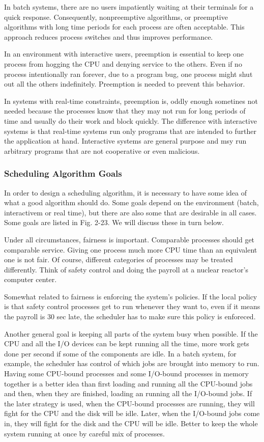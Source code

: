 \documentclass{book}
\begin{document}
In batch systems, there are no users impatiently waiting at their terminals for a quick response.
Consequently, nonpreemptive algorithms, or preemptive algorithms with long time periods for each process are often acceptable.
This approach reduces process switches and thus improves performance.

In an environment with interactive users, preemption is essential to 
keep one process from hogging the CPU and denying service to the others.
Even if no process intentionally ran forever, due to a program bug, one process might shut out all the others indefinitely.
Preemption is needed to prevent this behavior.

In systems with real-time constraints, preemption is, oddly enough sometines not needed because the processes know that
they may not run for long periods of time and usually do their work and block quickly.
The difference with interactive systems is that real-time systems run only programs that are intended to further the application at hand.
Interactive systems are general purpose and msy run arbitrary programs that are not cooperative or even malicious.

\subsubsection*{Scheduling Algorithm Goals}
In order to design a scheduling algorithm, it is necessary to have some idea of what a good algorithm should do.
Some goals depend on the environment (batch, interactivem or real time),
but there are also some that are desirable in all cases.
Some goals are listed in Fig. 2-23.
We will discuss these in turn below.

Under all circumstances, fairness is important.
Comparable processes should get comparable service.
Giving one process much more CPU time than an equivalent one is not fair.
Of course, different categories of processes may be treated differently.
Think of safety control and doing the payroll at a nuclear reactor's computer center.

Somewhat related to fairness is enforcing the system's policies.
If the local policy is that safety control processes get to run whenever they want to,
even if it means the payroll is 30 sec late, the scheduler has to make sure this policy is enforeced.

Another general goal is keeping all parts of the system busy when possible.
If the CPU and all the I/O devices can be kept running all the time, more work gets done per second if some of the components are idle.
In a batch system, for example, the scheduler has control of which jobs are brought into memory to run.
Having some CPU-bound processes and some I/O-bound processes in memory together is a better idea than 
first loading and running all the CPU-bound jobs and 
then, when they are finished, loading an running all the I/O-bound jobs.
If the later strategy is used, when the CPU-bound processes are running, 
they will fight for the CPU and the disk will be idle.
Later, when the I/O-bound jobs come in, they will fight for the disk and the CPU will be idle.
Better to keep the whole system running at once by careful mix of processes.
\end{document}
